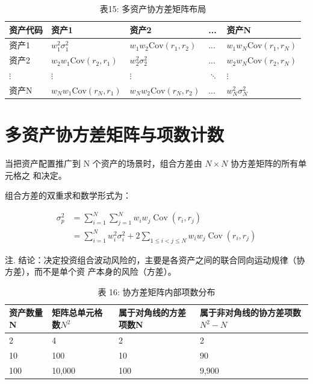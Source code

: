 \documentclass[lang=cn,10pt,color=blue]{elegantbook}
\begin{document}
\begin{table}[ht]
  \centering
  \caption{表15: 多资产协方差矩阵布局}
  \renewcommand{\arraystretch}{1.4}
\begin{tabularx}{\textwidth}{llYYY}
  \toprule
  资产代码 & 资产1 & 资产2 & ... & 资产N \\
  \midrule
  资产1 & $w_{1}^{2}\sigma_{1}^{2}$ & $w_{1}w_{2}\text{Cov}(r_{1},r_{2})$ & ... & $w_{1}w_{N}\text{Cov}(r_{1},r_{N})$ \\
  资产2 & $w_{2}w_{1}\text{Cov}(r_{2},r_{1})$ & $w_{2}^{2}\sigma_{2}^{2}$ & ... & $w_{2}w_{N}\text{Cov}(r_{2},r_{N})$ \\
  $\vdots$ & $\vdots$ & $\vdots$ & $\ddots$ & $\vdots$ \\
  资产N & $w_{N}w_{1}\text{Cov}(r_{N},r_{1})$ & $w_{N}w_{2}\text{Cov}(r_{N},r_{2})$ & ... & $w_{N}^{2}\sigma_{N}^{2}$ \\
  \bottomrule
\end{tabularx}
\end{table}

\section{多资产协方差矩阵与项数计数}

当把资产配置推广到 N 个资产的场景时，组合方差由 $N \times N$ 协方差矩阵的所有单元格之 和决定。 

组合方差的双重求和数学形式为： 

$$
\begin{aligned}
  \sigma_ {p} ^ {2} &= \sum_ {i = 1} ^ {N} \sum_ {j = 1} ^ {N} w _ {i} w _ {j} \operatorname{Cov} (r _ {i}, r _ {j}) \\[1.2ex]
  &= \sum_ {i = 1} ^ {N} w _ {i} ^ {2} \sigma_ {i} ^ {2} + 2 \sum_ {1 \leq i <   j \leq N} w _ {i} w _ {j} \operatorname{Cov} (r _ {i}, r _ {j})
\end{aligned}
$$

注. 结论：决定投资组合波动风险的，主要是各资产之间的联合同向运动规律（协方差），而不是单个资 产本身的风险（方差）。 

\begin{table}[ht]
  \centering
  \caption{表 16: 协方差矩阵内部项数分布}
  \renewcommand{\arraystretch}{1.4}
\begin{tabularx}{\textwidth}{llYY}
  \toprule
  资产数量N & 矩阵总单元格数$N^2$ & 属于对角线的方差项数N & 属于非对角线的协方差项数$N^2-N$ \\
   & 4 & 2 & 2 \\
  10 & 100 & 10 & 90 \\
  100 & 10,000 & 100 & 9,900 \\
  \bottomrule
\end{tabularx}
\end{table}
\end{document}

